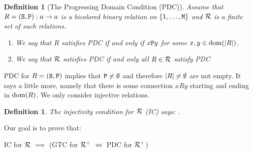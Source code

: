\documentclass{lmcs}
\newtheorem{definition}[theorem]{Definition}
\begin{document}
\begin{definition}[The Progressing Domain Condition (PDC)]
\label{definition-Progressing-Domain-Condition-PDC}
Assume that $R = ({\tt S},{\tt P}) : a \rightarrow a$ is a bicolored binary relation on 
$\{1, \ldots,{\tt M}\}$ and ${\mathcal R}$ is a finite set of such relations.
\begin{enumerate}
\item
We say that $R$ satisfies PDC if and only if $x {\tt P} y$ for some 
$x, y \in {\rm dom}({| R |})$.
\item
We say that ${\mathcal R}$ satisfies PDC if and only all $R \in {\mathcal R}$ satisfy PDC
\end{enumerate}
\end{definition}

PDC for  $R=({\tt S},{\tt P})$ implies that ${\tt P} \not = \emptyset$ and therefore ${| R |} \not = \emptyset $ are not empty. It says a little more, namely that there is some connection $x R y$ starting and ending in ${\rm dom}(R)$. We only consider injective relations.
\\

\begin{definition}
\label{definition-injectivity-condition-IC}
\emph{The injectivity condition for ${\mathcal R}$} (IC) says: 
 . 
\end{definition}

Our goal is to prove that:

\begin{center}
IC for ${\mathcal R}$ $\implies$ 
(GTC for ${\mathcal R}^+$ $\Leftrightarrow$ PDC  for ${\mathcal R}^+$)
\end{center}
\end{document}
